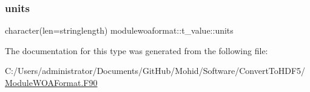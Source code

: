 \mbox{\label{structmodulewoaformat_1_1t__value_a44d6224663ece6db52ef2ac8ec65edb4}} 
\subsubsection{\texorpdfstring{units}{units}}
{\footnotesize\ttfamily character(len=stringlength) modulewoaformat\+::t\+\_\+value\+::units\hspace{0.3cm}{\ttfamily [private]}}



The documentation for this type was generated from the following file\+:\begin{DoxyCompactItemize}
\item 
C\+:/\+Users/administrator/\+Documents/\+Git\+Hub/\+Mohid/\+Software/\+Convert\+To\+H\+D\+F5/\mbox{\hyperlink{_module_w_o_a_format_8_f90}{Module\+W\+O\+A\+Format.\+F90}}\end{DoxyCompactItemize}

